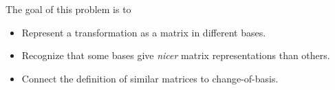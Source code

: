 \documentclass{workbook}
\newcommand{\displayonlynewpage}{\begin{displayonly}\newpage\end{displayonly}}
\newcommand{\bookonlynewpage}{\begin{bookonly}\newpage\end{bookonly}}
\begin{document}
\begin{slide}
	\bookonlynewpage
	\displayonlynewpage
	\question
	\begin{annotation}
		\begin{goals}

			The goal of this problem is to
			\begin{itemize}
				\item Represent a transformation as a matrix in different bases.
				\item Recognize that some bases give \emph{nicer} matrix representations
					than others.
				\item Connect the definition of similar matrices to change-of-basis.
			\end{itemize}
		\end{goals}


\end{annotation}
\end{slide}
\end{document}
